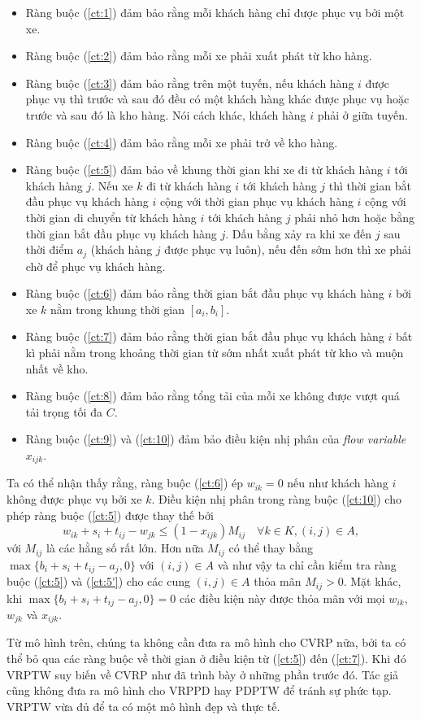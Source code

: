 \begin{itemize}
  \item Ràng buộc (\ref{ct:1}) đảm bảo rằng mỗi khách hàng chỉ được phục vụ bởi một xe.
  \item Ràng buộc (\ref{ct:2}) đảm bảo rằng mỗi xe phải xuất phát từ kho hàng.
  \item Ràng buộc (\ref{ct:3}) đảm bảo rằng trên một tuyến, nếu khách hàng $i$ được phục vụ thì trước và sau đó đều có một khách hàng khác được phục vụ hoặc trước và sau đó là kho hàng. Nói cách khác, khách hàng $i$ phải ở giữa tuyến.
  \item Ràng buộc (\ref{ct:4}) đảm bảo rằng mỗi xe phải trở về kho hàng.
  \item Ràng buộc (\ref{ct:5}) đảm bảo về khung thời gian khi xe đi từ khách hàng $i$ tới khách hàng $j$. Nếu xe $k$ đi từ khách hàng $i$ tới khách hàng $j$ thì thời gian bắt đầu phục vụ khách hàng $i$ cộng với thời gian phục vụ khách hàng $i$ cộng với thời gian di chuyển từ khách hàng $i$ tới khách hàng $j$ phải nhỏ hơn hoặc bằng thời gian bắt đầu phục vụ khách hàng $j$. Dấu bằng xảy ra khi xe đến $j$ sau thời điểm $a_j$ (khách hàng $j$ được phục vụ luôn), nếu đến sớm hơn thì xe phải chờ để phục vụ khách hàng.
  \item Ràng buộc (\ref{ct:6}) đảm bảo rằng thời gian bắt đầu phục vụ khách hàng $i$ bởi xe $k$ nằm trong khung thời gian $[a_i, b_i]$.
  \item Ràng buộc (\ref{ct:7}) đảm bảo rằng thời gian bắt đầu phục vụ khách hàng $i$ bất kì phải nằm trong khoảng thời gian từ sớm nhất xuất phát từ kho và muộn nhất về kho.
  \item Ràng buộc (\ref{ct:8}) đảm bảo rằng tổng tải của mỗi xe không được vượt quá tải trọng tối đa $C$.
  \item Ràng buộc (\ref{ct:9}) và (\ref{ct:10}) đảm bảo điều kiện nhị phân của \textit{flow variable} $x_{ijk}$.
\end{itemize}

Ta có thể nhận thấy rằng, ràng buộc (\ref{ct:6}) ép $w_{ik} = 0$ nếu như khách hàng $i$ không được phục vụ bởi xe $k$. Điều kiện nhị phân trong ràng buộc (\ref{ct:10}) cho phép ràng buộc (\ref{ct:5}) được thay thế bởi 
\begin{equation}
  \label{ct:5'}
  w_{ik} + s_i + t_{ij} - w_{jk} \leq (1 - x_{ijk}) M_{ij} \quad \forall k \in K, (i,j) \in A,
\end{equation}
với $M_{ij}$ là các hằng số rất lớn. Hơn nữa $M_{ij}$ có thể thay bằng $\max \{b_i + s_i + t_{ij} - a_j, 0\}$ với $(i,j) \in A$ và như vậy ta chỉ cần kiểm tra ràng buộc (\ref{ct:5}) và (\ref{ct:5'}) cho các cung $(i, j) \in A$ thỏa mãn $M_{ij} > 0$. Mặt khác, khi $\max \{b_i + s_i + t_{ij} - a_j, 0\} = 0$ các điều kiện này được thỏa mãn với mọi $w_{ik}$, $w_{jk}$ và $x_{ijk}$.

Từ mô hình trên, chúng ta không cần đưa ra mô hình cho CVRP nữa, bởi ta có thể bỏ qua các ràng buộc về thời gian ở điều kiện từ (\ref{ct:5}) đến (\ref{ct:7}). Khi đó VRPTW suy biến về CVRP như đã trình bày ở những phần trước đó. Tác giả cũng không đưa ra mô hình cho VRPPD hay PDPTW để tránh sự phức tạp. VRPTW vừa đủ để ta có một mô hình đẹp và thực tế.